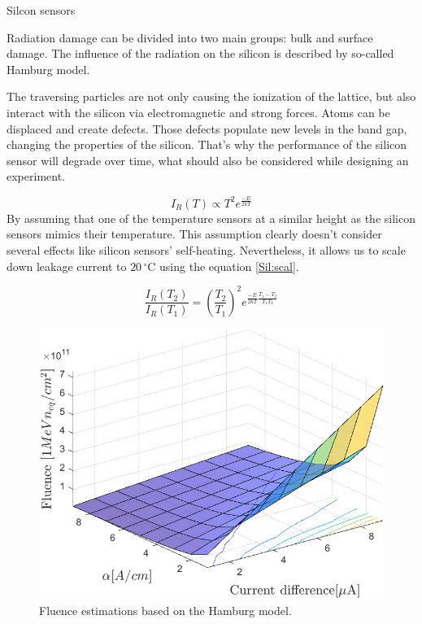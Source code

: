 Silcon sensors

Radiation damage can be divided into two main groups: bulk and surface damage. The influence of the radiation on the silicon is described by so-called Hamburg model. 

The traversing particles are not only causing the ionization of the lattice, but also interact with the silicon via electromagnetic and strong forces. Atoms can be displaced and create defects. Those defects populate new levels in the band gap, changing the properties of the silicon. That’s why the performance of the silicon sensor will degrade over time, what should also be considered while designing an experiment. 




\begin{equation}
\label{Sil:temp}
    I_{R}(T) \propto T^{2}e^{\frac{-E}{2kT}}
\end{equation}
 By assuming that one of the  temperature sensors at a similar height as the silicon sensors mimics their temperature. This assumption clearly doesn't consider several effects like silicon sensors' self-heating. Nevertheless, it allows us to scale down leakage current to $20\,^{\circ}$C using the equation \ref{Sil:scal}.
 
\begin{equation}
\label{Sil:scal}
    \frac{I_{R}(T_{2})}{I_{R}(T_{1})} = (\frac{T_{2}}{T_{1}})^{2}e^{\frac{-E}{2kT}\frac{T_{1}-T_{2}}{T_{1}T_{2}}}
\end{equation}

\begin{figure}[!h]
\centering
\includegraphics[width=0.65\columnwidth]{Chapter2/images/Leakage_current.png}
\caption{Fluence estimations based on the Hamburg model.}
\label{fig_leakage}
\end{figure}

